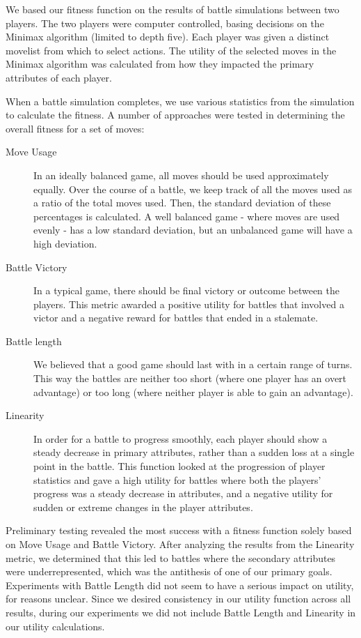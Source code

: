\documentclass{acm_proc_article-sp}
\begin{document}
We based our fitness function on the results of battle simulations between two players.  The two players were computer controlled, basing decisions on the Minimax algorithm (limited to depth five). Each player was given a distinct movelist from which to select actions. The utility of the selected moves in the Minimax algorithm was calculated from how they impacted the primary attributes of each player. 

When a battle simulation completes, we use various statistics from the simulation to calculate the fitness. A number of approaches were tested in determining the overall fitness for a set of moves:

\begin{description}
    \item[Move Usage] In an ideally balanced game, all moves should be used approximately equally. Over the course of a battle, we keep track of all the moves used as a ratio of the total moves used. Then, the standard deviation of these percentages is calculated. A well balanced game - where moves are used evenly - has a low standard deviation, but an unbalanced game will have a high deviation.
    \item[Battle Victory] In a typical game, there should be final victory or outcome between the players. This metric awarded a positive utility for battles that involved a victor and a negative reward for battles that ended in a stalemate.
    \item[Battle length] We believed that a good game should last with in a certain range of turns. This way the battles are neither too short (where one player has an overt advantage) or too long (where neither player is able to gain an advantage). 
    \item[Linearity] In order for a battle to progress smoothly, each player should show a steady decrease in primary attributes, rather than a sudden loss at a single point in the battle. This function looked at the progression of player statistics and gave a high utility for battles where both the players’ progress was a steady decrease in attributes, and a negative utility for sudden or extreme changes in the player attributes.
\end{description}

Preliminary testing revealed the most success with a fitness function solely based on Move Usage and Battle Victory. After analyzing the results from the Linearity metric, we determined that this led to battles where the secondary attributes were underrepresented, which was the antithesis of one of our primary goals. Experiments with Battle Length did not seem to have a serious impact on utility, for reasons unclear. Since we desired consistency in our utility function across all results, during our experiments we did not include Battle Length and Linearity in our utility calculations.
\end{document}

